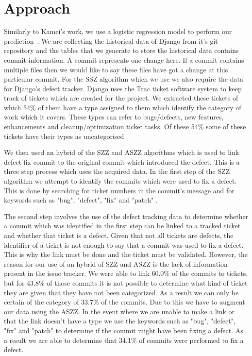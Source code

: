 \documentclass[10pt, conference]{IEEEtran}
\begin{document}
\section{Approach}
\label{sec:approach}



Similarly to Kamei's work, we use a logistic regression model to perform our prediction~\cite{Kamei2013TSE}. We are collecting the historical data of Django from it's git repository and the tables that we generate to store the historical data contains commit information. A commit represents one change here. If a commit contains multiple files then we would like to say these files have got a change at this particular commit. For the SSZ algorithm which we use we also require the data for Django's defect tracker. Django uses the Trac ticket software system to keep track of tickets which are created for the project. We extracted these tickets of which 54\% of them have a type assigned to them which identify the category of work which it covers. These types can refer to bugs/defects, new features, enhancements and cleanup/optimization ticket tasks. Of these 54\% some of these tickets have their types as uncategorised  

We then used an hybrid of the SZZ and ASZZ algorithms\cite{Sliwerski2005MSR} which is used to link defect fix commit to the original commit which introduced the defect. This is a three step process which uses the acquired data. In the first step of the SZZ algorithm we attempt to identify the commits which were used to fix a defect. This is done by searching for ticket numbers in the commit's message and for keywords such as "bug", "defect", "fix" and "patch" \cite{Kamei2013TSE}. 

The second step involves the use of the defect tracking data to determine whether a commit which was identified in the first step can be linked to a tracked ticket and whether that ticket is a defect. Given that not all tickets are defects, the identifier of a ticket is not enough to say that a commit was used to fix a defect. This is why the link must be done and the ticket must be validated. However, the reason for our use of an hybrid of SZZ and ASZZ is the lack of information present in the issue tracker. We were able to link 60.0\% of the commits to tickets, but for 43.8\% of those commits it is not possible to determine what kind of ticket they are given that they have not been categorized. As a result we can only be certain of the category of 33.7\% of the commits. Due to this we have to augment our data using the ASZZ. In the event where we are unable to make a link or that the link doesn't have a type we use the keywords such as "bug", "defect", "fix" and "patch" \cite{Kamei2013TSE} to determine if the commit might have been fixing a defect. As a result we are able to determine that 34.1\% of commits were performed to fix a defect. 
\end{document}
